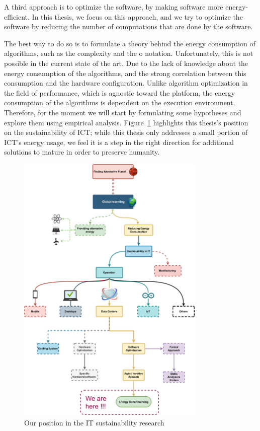 A third approach is to optimize the software, by making software more energy-efficient. In this thesis, we focus on this approach, and we try to optimize the software by reducing the number of computations that are done by the software. 

The best way to do so is to formulate a theory behind the energy consumption of algorithms, such as the complexity and the o notation.
Unfortunately, this is not possible in the current state of the art. Due to the lack of knowledge about the energy consumption of the algorithms, and the strong correlation between this consumption and the hardware configuration.
Unlike algorithm optimization in the field of performance, which is agnostic toward the platform, the energy consumption of the algorithms is dependent on the execution environment.
Therefore, for the moment we will start by formulating some hypotheses and explore them using empirical analysis.
Figure~\ref{fig:thesis_position} highlights this thesis's position on the sustainability of ICT\@; while this thesis only addresses a small portion of ICT's energy usage, we feel it is a step in the right direction for additional solutions to mature in order to preserve humanity.
\begin{figure}[!h]
    \caption{Our position in the IT sustainability research}
    \label{fig:thesis_position}
    \centering
    \includegraphics[width=0.8\textwidth,height=\textheight,keepaspectratio]{chapters/thesis_position.pdf}
\end{figure}
